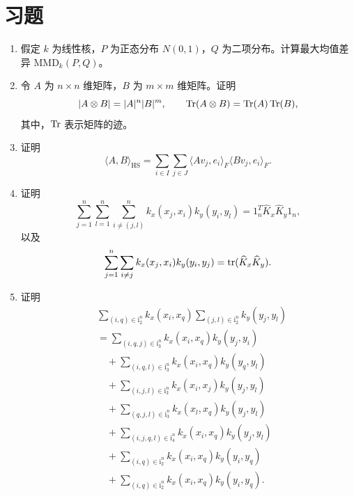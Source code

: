 \section*{习题}
\begin{enumerate}[label=\textbf{习题 \arabic*.},leftmargin=4.7em]
\item 假定 $k$ 为线性核，$P$ 为正态分布 $N(0,1)$，$Q$ 为二项分布。计算最大均值差异 $\mathrm{MMD}_k(P,Q)$。

\item 令 $A$ 为 $n\times n$ 维矩阵，$B$ 为 $m\times m$ 维矩阵。证明
\[
|A\otimes B|=|A|^n|B|^m,\qquad
\operatorname{Tr}(A\otimes B)=\operatorname{Tr}(A)\operatorname{Tr}(B),
\]
其中，$\operatorname{Tr}$ 表示矩阵的迹。

\item 证明
\[
\langle A,B\rangle_{\mathrm{HS}}
=\sum_{i\in I}\sum_{j\in J}\langle Av_j,e_i\rangle_F\langle Bv_j,e_i\rangle_F.
\]

\item 证明
\[
\sum_{j=1}^n\sum_{l=1}^n\sum_{i\ne(j,l)}^nk_x(x_j,x_i)k_y(y_i,y_l)
=1_n^T\widehat K_x\widehat K_y1_n,
\]
以及
\[
\sum_{j=1}^n\sum_{i\ne j}k_x(x_j,x_i)k_y(y_i,y_j)
=\operatorname{tr}(\widehat K_x\widehat K_y).
\]

\item 证明
\[
\begin{aligned}
&\sum_{(i,q)\in\mathrm i_2^n}k_x(x_i,x_q)\sum_{(j,l)\in\mathrm i_2^n}k_y(y_j,y_l)\\
&=\sum_{(i,q,j)\in\mathrm i_3^n}k_x(x_i,x_q)k_y(y_j,y_i)\\
&\quad+\sum_{(i,q,l)\in\mathrm i_3^n}k_x(x_i,x_q)k_y(y_q,y_l)\\
&\quad+\sum_{(i,j,l)\in\mathrm i_3^n}k_x(x_i,x_j)k_y(y_j,y_l)\\
&\quad+\sum_{(q,j,l)\in\mathrm i_3^n}k_x(x_l,x_q)k_y(y_j,y_l)\\
&\quad+\sum_{(i,j,q,l)\in\mathrm i_4^n}k_x(x_i,x_q)k_y(y_j,y_l)\\
&\quad+\sum_{(i,q)\in\mathrm i_2^n}k_x(x_i,x_q)k_y(y_i,y_q)\\
&\quad+\sum_{(i,q)\in\mathrm i_2^n}k_x(x_i,x_q)k_y(y_i,y_q).
\end{aligned}
\]


\end{enumerate}
